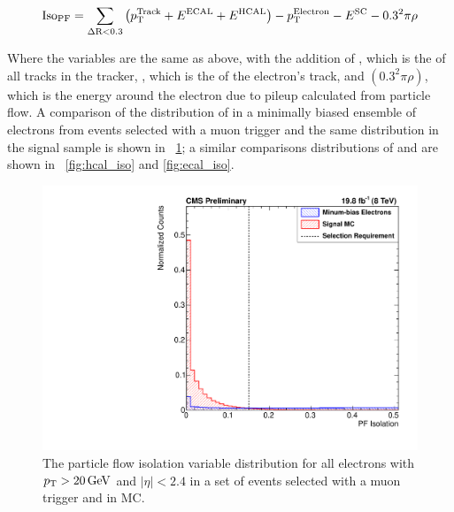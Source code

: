 \begin{equation}
    \text{Iso}_{\text{PF}} = \sum_{\Delta \text{R}<0.3} \left(p_{\mathrm{T}}^{\text{Track}} + E^{\text{ECAL}} + E^{\text{HCAL}}\right) - p_{\mathrm{T}}^{\text{Electron}}
    - E^{\text{SC}} - 0.3^{2} \pi \rho
\end{equation}

Where the variables are the same as above, with the addition of \ptTrack, which
is the \pt of all tracks in the tracker, \ptElectron, which is the \pt of the
electron's track, and $\left(0.3^{2} \pi \rho\right)$, which is the energy
around the electron due to pileup calculated from particle flow. A comparison
of the distribution of \PFISO in a minimally biased ensemble of electrons from
events selected with a muon trigger and the same distribution in the \MADGRAPH
signal sample is shown in \FIG~\ref{fig:pf_iso}; a similar comparisons
distributions of \HCALISO and \ECALISO are shown in \FIGS~\ref{fig:hcal_iso}
and \ref{fig:ecal_iso}.

\begin{figure}[!htbp]
    \centering
    \includegraphics[width=\StackedPlotWidth]{figures/e_reco_var_iso.pdf}
    \caption[
        Distributions of particle flow isolation variables in data and MC.
    ]{
        The particle flow isolation variable distribution for all electrons
        with $p_{\mathrm{T}} > 20 \,\text{Ge\hspace{-.08em}V}$ and $|\eta| < 2.4$ in a set of events selected
        with a muon trigger and in \MADGRAPH \Ztoee MC.
    }
    \label{fig:pf_iso}
\end{figure}

